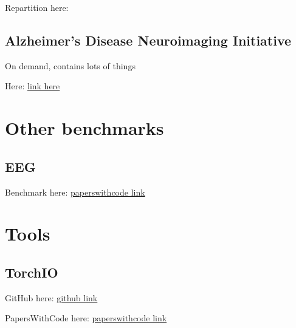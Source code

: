Repartition here: 


\begin{table}[htbp]
	\centering
	\caption{Repartition in the benchmark of AOMIC ()}
	\label{tab:aomic}
\end{table}

\subsection{Alzheimer's Disease Neuroimaging Initiative}

On demand, contains lots of things

Here: \href{https://adni.loni.usc.edu/}{link here}

\section{Other benchmarks}

\subsection{EEG}

Benchmark here: \href{https://paperswithcode.com/dataset/epilepsy-seizure-prediction}{paperswithcode link}

\section{Tools}

\subsection{TorchIO}

GitHub here: \href{https://github.com/TorchIO-project/torchio}{github link}

PapersWithCode here: \href{https://paperswithcode.com/paper/torchio-a-python-library-for-efficient}{paperswithcode link}
